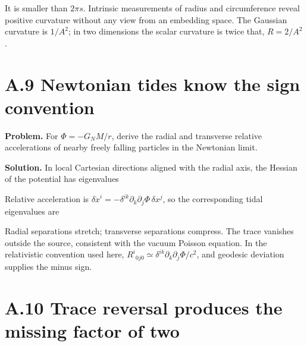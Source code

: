 \documentclass[
  11pt,
  letterpaper,
  oneside,
  openany]{scrbook}
\begin{document}
It is smaller than \(2\pi s\). Intrinsic measurements of radius and
circumference reveal positive curvature without any view from an
embedding space. The Gaussian curvature is \(1/A^2\); in two dimensions
the scalar curvature is twice that, \(R=2/A^2\).

\hypertarget{a.9-newtonian-tides-know-the-sign-convention}{%
\section{A.9 Newtonian tides know the sign
convention}\label{a.9-newtonian-tides-know-the-sign-convention}}

\textbf{Problem.} For \(\Phi=-G_NM/r\), derive the radial and transverse
relative accelerations of nearby freely falling particles in the
Newtonian limit.

\textbf{Solution.} In local Cartesian directions aligned with the radial
axis, the Hessian of the potential has eigenvalues

\begin{center}
\begingroup
{}
\ifdim\wd\grmathbox>\linewidth
\resizebox{\linewidth}{!}{\usebox{\grmathbox}}
\else\usebox{\grmathbox}\fi
\endgroup
\end{center}

Relative acceleration is
\(\delta\ddot x^i=-\delta^{ik}\partial_k\partial_j\Phi\,\delta x^j\), so
the corresponding tidal eigenvalues are

\begin{center}
\begingroup
{}
\ifdim\wd\grmathbox>\linewidth
\resizebox{\linewidth}{!}{\usebox{\grmathbox}}
\else\usebox{\grmathbox}\fi
\endgroup
\end{center}

Radial separations stretch; transverse separations compress. The trace
vanishes outside the source, consistent with the vacuum Poisson
equation. In the relativistic convention used here,
\(R^i{}_{0j0}\simeq\delta^{ik}\partial_k\partial_j\Phi/c^2\), and
geodesic deviation supplies the minus sign.

\hypertarget{a.10-trace-reversal-produces-the-missing-factor-of-two}{%
\section{A.10 Trace reversal produces the missing factor of
two}\label{a.10-trace-reversal-produces-the-missing-factor-of-two}}
\end{document}
